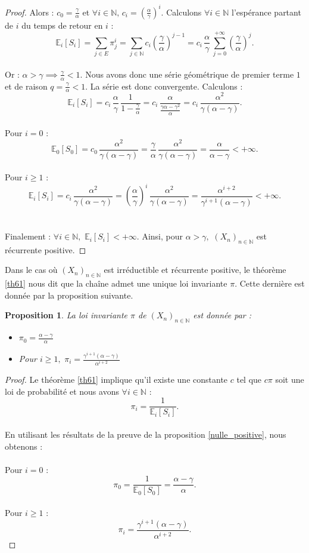 \documentclass[12pt,a4paper]{report}
\newtheorem{prop}[thm]{Proposition}
\theoremstyle{remark}
\begin{document}
\begin{proof}
Alors : $c_0 = \frac{\gamma}{\alpha}$ et $\forall i \in \mathbb{N}, \, c_i = \left(\frac{\alpha}{\gamma}\right)^i$. Calculons $\forall i \in \mathbb{N}$ l'espérance partant de $i$ du temps de retour en $i$ :
$$\mathbb{E}_i[S_i] = \sum\limits_{j\in E }\pi_j^i = \sum\limits_{j\in \mathbb{N} }c_i \left(\frac{\gamma}{\alpha}\right)^{j-1} = c_i \,  \frac{\alpha}{\gamma} \, \sum\limits_{j = 0 }^{+\infty} \left(\frac{\gamma}{\alpha}\right)^{j}.$$
\\
Or : $\alpha > \gamma \implies \frac{\gamma}{\alpha} < 1$. Nous avons donc une série géométrique de premier terme $1$ et de raison $q = \frac{\gamma}{\alpha} < 1$. La série est donc convergente. Calculons :
$$\mathbb{E}_i[S_i] = c_i \,  \frac{\alpha}{\gamma} \, \frac{1}{1 - \frac{\gamma}{\alpha}} = c_i \,  \frac{\alpha}{ \frac{\gamma \alpha - \gamma^2}{\alpha}} = c_i \,  \frac{\alpha^2}{\gamma(\alpha - \gamma)}.$$
\\
Pour $i = 0$ : $$\mathbb{E}_0[S_0] = c_0 \,  \frac{\alpha^2}{\gamma(\alpha - \gamma)} = \frac{\gamma}{\alpha}  \,  \frac{\alpha^2}{\gamma(\alpha - \gamma)} = \frac{\alpha}{\alpha - \gamma} < +\infty.$$
\\
Pour $i \geqslant 1$ : $$\mathbb{E}_i[S_i] = c_i \,  \frac{\alpha^2}{\gamma(\alpha - \gamma)} = \left(\frac{\alpha}{\gamma}\right)^i  \,  \frac{\alpha^2}{\gamma(\alpha - \gamma)} = \frac{\alpha^{i+2}}{\gamma^{i+1}(\alpha - \gamma)} < +\infty.$$
\\
\\
Finalement : $\forall i \in \mathbb{N}, \, \, \mathbb{E}_i[S_i] < +\infty$. Ainsi, pour $\alpha > \gamma, \, \, (X_n)_{n \in \mathbb{N}}$ est récurrente positive.
\end{proof}
Dans le cas où $(X_n)_{n \in \mathbb{N}}$ est irréductible et récurrente positive, le théorème \ref{th61} nous dit que la chaîne admet une unique loi invariante $\pi$. Cette dernière est donnée par la proposition suivante.
\begin{prop}
La loi invariante $\pi$ de $(X_n)_{n \in \mathbb{N}}$ est donnée par :
\begin{itemize}
    \item $\pi_0 = \frac{\alpha - \gamma}{\alpha}$
    \item Pour $i \geqslant 1, \, \, \pi_i = \frac{\gamma^{i+1}(\alpha - \gamma)}{\alpha^{i+2}}$
\end{itemize}
\end{prop}
\begin{proof}
Le théorème \ref{th61} implique qu'il existe une constante $c$ tel que $c\pi$ soit une loi de probabilité et nous avons $\forall i \in \mathbb{N}$ : 
$$\pi_i = \frac{1}{\mathbb{E}_i[S_i]}.$$
\\
En utilisant les résultats de la preuve de la proposition \ref{nulle_positive}, nous obtenons :
\\
\\
Pour $i = 0$ : $$\pi_0 = \frac{1}{\mathbb{E}_0[S_0]} = \frac{\alpha - \gamma}{\alpha}.$$
\\
Pour $i \geqslant 1$ : $$\pi_i = \frac{\gamma^{i+1}(\alpha - \gamma)}{\alpha^{i+2}}.$$
\end{proof}
\end{document}
